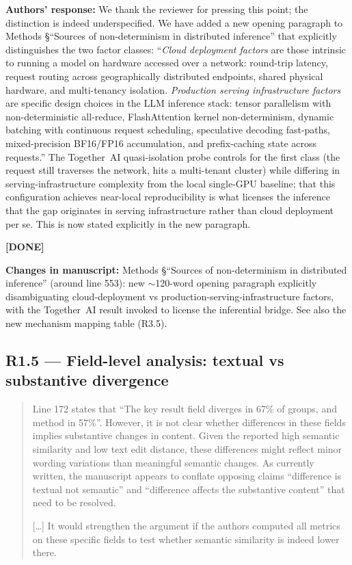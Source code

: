 \documentclass[11pt,a4paper]{article}
\newenvironment{revquote}{%
  \begin{quote}\small\itshape\color{revgray}
}{%
  \end{quote}
}
\newcommand{\response}[1]{\par\noindent\textbf{\color{revgreen}Authors' response:} #1\par}
\newcommand{\changes}[1]{\par\noindent\textbf{\color{revblue}Changes in manuscript:} #1\par}
\newcommand{\done}{\color{revgreen}\textbf{[DONE]}}
\begin{document}
\response{We thank the reviewer for pressing this point; the distinction is indeed underspecified. We have added a new opening paragraph to Methods §``Sources of non-determinism in distributed inference'' that explicitly distinguishes the two factor classes: ``\emph{Cloud deployment factors} are those intrinsic to running a model on hardware accessed over a network: round-trip latency, request routing across geographically distributed endpoints, shared physical hardware, and multi-tenancy isolation. \emph{Production serving infrastructure factors} are specific design choices in the LLM inference stack: tensor parallelism with non-deterministic all-reduce, FlashAttention kernel non-determinism, dynamic batching with continuous request scheduling, speculative decoding fast-paths, mixed-precision BF16/FP16 accumulation, and prefix-caching state across requests.'' The Together~AI quasi-isolation probe controls for the first class (the request still traverses the network, hits a multi-tenant cluster) while differing in serving-infrastructure complexity from the local single-GPU baseline; that this configuration achieves near-local reproducibility is what licenses the inference that the gap originates in serving infrastructure rather than cloud deployment per se. This is now stated explicitly in the new paragraph.} \done

\changes{Methods §``Sources of non-determinism in distributed inference'' (around line 553): new $\sim$120-word opening paragraph explicitly disambiguating cloud-deployment vs production-serving-infrastructure factors, with the Together~AI result invoked to license the inferential bridge. See also the new mechanism mapping table (R3.5).}

\subsection*{R1.5 --- Field-level analysis: textual vs substantive divergence}

\begin{revquote}
Line 172 states that ``The key result field diverges in 67\% of groups, and method in 57\%''. However, it is not clear whether differences in these fields implies substantive changes in content. Given the reported high semantic similarity and low text edit distance, these differences might reflect minor wording variations than meaningful semantic changes. As currently written, the manuscript appears to conflate opposing claims ``difference is textual not semantic'' and ``difference affects the substantive content'' that need to be resolved.

[\ldots] It would strengthen the argument if the authors computed all metrics on these specific fields to test whether semantic similarity is indeed lower there.
\end{revquote}
\end{document}
